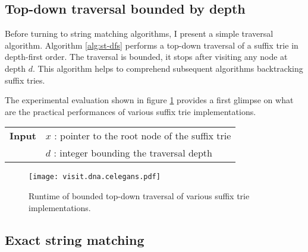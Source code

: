 \subsection{Top-down traversal bounded by depth}
\label{sec:index:algo:traversal}

Before turning to string matching algorithms, I present a simple traversal algorithm.
Algorithm \ref{alg:st-dfs} performs a top-down traversal of a suffix trie in depth-first order.
The traversal is bounded, \ie it stops after visiting any node at depth $d$.
This algorithm helps to comprehend subsequent algorithms backtracking suffix tries.

The experimental evaluation shown in figure \ref{fig:visit-dna} provides a first glimpse on what are the practical performances of various suffix trie implementations.

\begin{center}
\begin{minipage}[t]{.7\textwidth}
\begin{algorithm}[H]
\begin{tabular}{ll}
\textbf{Input}  & $x$ : pointer to the root node of the suffix trie\\
 			    & $d$ : integer bounding the traversal depth\\
\end{tabular}
\begin{algorithmic}[1]
		\Repeat
			\State {}
		\Until {}
	\EndIf
\EndIf
\end{algorithmic}
\label{alg:st-dfs}
\end{algorithm}
\end{minipage}
\end{center}

\begin{figure}[h]
\begin{center}
\caption[Top-down traversal runtime]{Runtime of bounded top-down traversal of various suffix trie implementations.}
\label{fig:visit-dna}
\texttt{[image: visit.dna.celegans.pdf]}
\end{center}
\end{figure}

\subsection{Exact string matching}
\label{sec:index:algo:exact}

